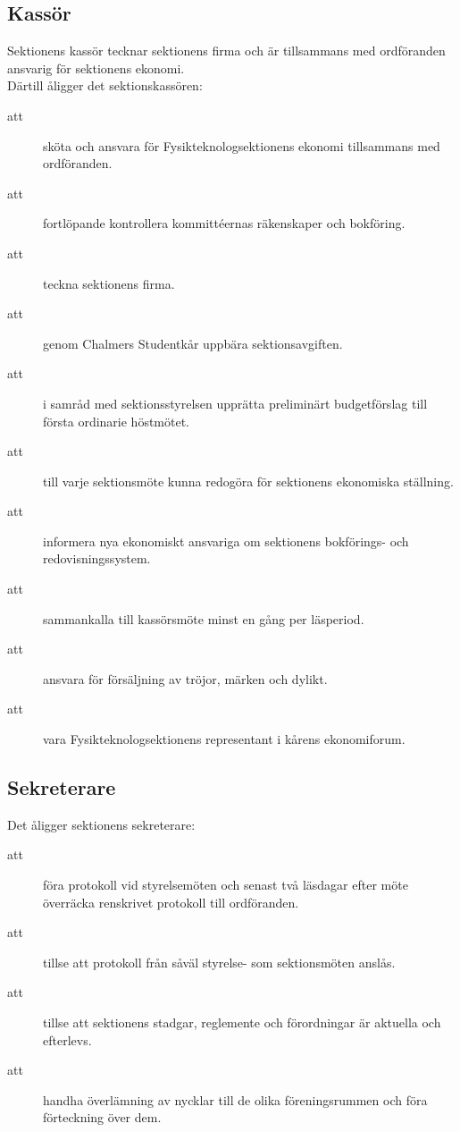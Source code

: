 \documentclass[a4paper]{article}
\begin{document}
\begin{foreningenv}{\forening{}}
    \subsection{Kassör}
    Sektionens kassör tecknar sektionens firma och är tillsammans med ordföranden ansvarig för sektionens ekonomi. \\
    Därtill åligger det sektionskassören:
    \begin{description}
        \item[att] sköta och ansvara för Fysikteknologsektionens ekonomi tillsammans med ordföranden.
        \item[att] fortlöpande kontrollera kommittéernas räkenskaper och bokföring.
        \item[att] teckna sektionens firma.
        \item[att] genom Chalmers Studentkår uppbära sektionsavgiften.
        \item[att] i samråd med sektionsstyrelsen upprätta preliminärt budgetförslag till första ordinarie höstmötet.
        \item[att] till varje sektionsmöte kunna redogöra för sektionens ekonomiska ställning.
        \item[att] informera nya ekonomiskt ansvariga om sektionens bokförings- och redovisningssystem.
        \item[att] sammankalla till kassörsmöte minst en gång per läsperiod.
        \item[att] ansvara för försäljning av tröjor, märken och dylikt.
        \item[att] vara Fysikteknologsektionens representant i kårens ekonomiforum. 
    \end{description}
    
    \subsection{Sekreterare}
    Det åligger sektionens sekreterare:
    \begin{description}
        \item[att] föra protokoll vid styrelsemöten och senast två läsdagar efter möte överräcka renskrivet protokoll till ordföranden.
        \item[att] tillse att protokoll från såväl styrelse- som sektionsmöten anslås.
        \item[att] tillse att sektionens stadgar, reglemente och förordningar är aktuella och efterlevs.
        \item[att] handha överlämning av nycklar till de olika föreningsrummen och föra förteckning över dem.
    \end{description}
    

\end{foreningenv}
\end{document}
